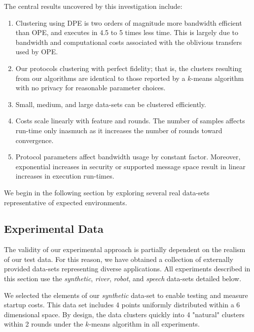 The central results uncovered by this investigation include:

\newcommand{\itembase}{\setlength{\itemsep}{-3pt}}

\begin{enumerate}
\itembase

\item
Clustering using DPE is two orders of magnitude more bandwidth
efficient than OPE, and executes in 4.5 to 5 times less time.  This is
largely due to bandwidth and computational costs associated with the
oblivious transfers used by OPE.

\item 
Our protocols clustering with perfect fidelity; that is, the clusters
resulting from our algorithms are identical to those reported by a
$k$-means algorithm with no privacy for reasonable parameter choices.

\item
Small, medium, and large data-sets can be clustered efficiently.

\item
Costs scale linearly with feature and rounds.  The number of samples
affects run-time only inasmuch as it increases the number of rounds
toward convergence.

\item
Protocol parameters affect bandwidth usage by constant factor.
Moreover, exponential increases in security or supported message space
result in linear increases in execution run-times.

\end{enumerate}

\noindent
We begin in the following section by exploring several real data-sets
representative of expected environments.

\subsection{Experimental Data}
\label{sec:exdata}

The validity of our experimental approach is partially dependent on
the realism of our test data.  For this reason, we have obtained a
collection of externally provided data-sets representing diverse
applications.  All experiments described in this section use the
{\it synthetic}, {\it river}, {\it robot}, and {\it speech} data-sets
detailed below.

We selected the elements of our {\it synthetic} data-set to enable
testing and measure startup costs.  This data set includes 4 points
uniformly distributed within a 6 dimensional space.  By design, the
data clusters quickly into 4 "natural" clusters within 2 rounds under
the $k$-means algorithm in all experiments.


